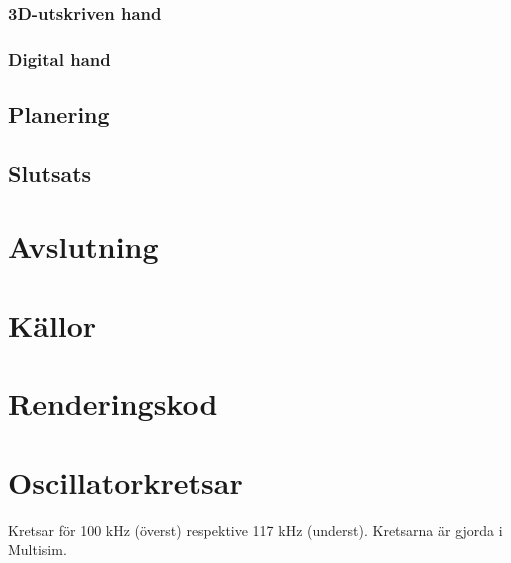 \documentclass[a4paper]{article}
\begin{document}
\begin{sloppypar}
    \subsubsection{3D-utskriven hand}
    \subsubsection{Digital hand}

    \subsection{Planering}

    \subsection{Slutsats}

    \section{Avslutning}




    \section{Källor}
    \printbibliography[heading=none]

    \appendices
    \titleformat{\section}[display]
    {\normalfont\Large\bfseries}{\appendixname\enspace\thesection}{.5em}{} %
    \section{Renderingskod}

    \section{Oscillatorkretsar}
    Kretsar för 100 kHz (överst) respektive 117 kHz (underst). Kretsarna är gjorda i Multisim.


\end{sloppypar}
\end{document}
